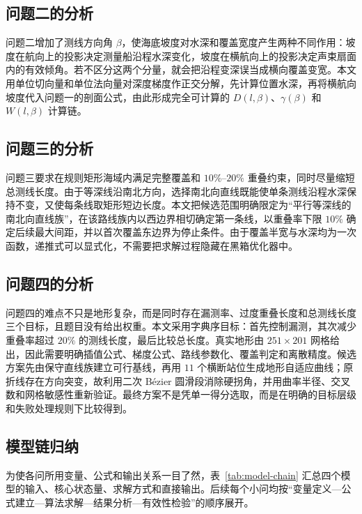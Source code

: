 \subsection{问题二的分析}
问题二增加了测线方向角 $\beta$，使海底坡度对水深和覆盖宽度产生两种不同作用：坡度在航向上的投影决定测量船沿程水深变化，坡度在横航向上的投影决定声束扇面内的有效倾角。若不区分这两个分量，就会把沿程变深误当成横向覆盖变宽。本文用单位切向量和单位法向量对深度梯度作正交分解，先计算位置水深，再将横航向坡度代入问题一的剖面公式，由此形成完全可计算的 $D(l,\beta)$、$\gamma(\beta)$ 和 $W(l,\beta)$ 计算链。

\subsection{问题三的分析}
问题三要求在规则矩形海域内满足完整覆盖和 $10\%$--$20\%$ 重叠约束，同时尽量缩短总测线长度。由于等深线沿南北方向，选择南北向直线既能使单条测线沿程水深保持不变，又使每条线取矩形短边长度。本文把候选范围明确限定为“平行等深线的南北向直线族”，在该路线族内以西边界相切确定第一条线，以重叠率下限 $10\%$ 确定后续最大间距，并以首次覆盖东边界为停止条件。由于覆盖半宽与水深均为一次函数，递推式可以显式化，不需要把求解过程隐藏在黑箱优化器中。

\subsection{问题四的分析}
问题四的难点不只是地形复杂，而是同时存在漏测率、过度重叠长度和总测线长度三个目标，且题目没有给出权重。本文采用字典序目标：首先控制漏测，其次减少重叠率超过 $20\%$ 的测线长度，最后比较总长度。真实地形由 $251\times201$ 网格给出，因此需要明确插值公式、梯度公式、路线参数化、覆盖判定和离散精度。候选方案先由保守直线族建立可行基线，再用 $11$ 个横断站位生成地形自适应曲线；原折线存在方向突变，故利用二次 Bézier 圆滑段消除硬拐角，并用曲率半径、交叉数和网格敏感性重新验证。最终方案不是凭单一得分选取，而是在明确的目标层级和失败处理规则下比较得到。

\subsection{模型链归纳}
为使各问所用变量、公式和输出关系一目了然，表~\ref{tab:model-chain} 汇总四个模型的输入、核心状态量、求解方式和直接输出。后续每个小问均按“变量定义—公式建立—算法求解—结果分析—有效性检验”的顺序展开。

